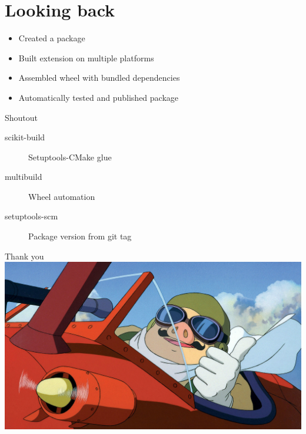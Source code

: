 \documentclass[pdf]{beamer}
\begin{document}
\section{Looking back}

\begin{frame}
    \begin{itemize}
        \item Created a package
        \item Built extension on multiple platforms
        \item Assembled wheel with bundled dependencies
        \item Automatically tested and published package
    \end{itemize}
\end{frame}

\begin{frame}{Shoutout}
    \begin{description}
        \item [scikit-build] Setuptools-CMake glue
        \item [multibuild] Wheel automation
        \item [setuptools-scm] Package version from git tag
    \end{description}
\end{frame}

\begin{frame}{Thank you}
    \includegraphics[width = \textwidth]{img/porcorosso.jpg}
\end{frame}
\end{document}
